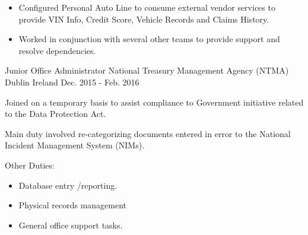 \begin{cventries}
{\begin{cvitems}
{\begin{itemize}
  		\item Configured Personal Auto Line to consume external vendor 				services to provide VIN Info, Credit Score, Vehicle 					Records and Claims History.  
  		\item Worked in conjunction with several other teams to 						provide support and resolve dependencies.
		\end{itemize}
		}
      \end{cvitems}	}
  \cventry
    {Junior Office Administrator} %
    {National Treasury Management Agency (NTMA)} %
    {Dublin Ireland} %
    {Dec. 2015 - Feb. 2016} %
    {
      \begin{cvitems} %
        \item {Joined on a temporary basis to assist compliance to Government initiative related to the Data Protection Act.}
        \item {Main duty involved re-categorizing documents entered in error to the National Incident Management System (NIMs).}
        \item {Other Duties:
        	\begin{itemize}
        		\item Database entry /reporting.
				\item Physical records management
				\item General office support tasks.
			\end{itemize}
			}
      \end{cvitems}
    }
\end{cventries}
